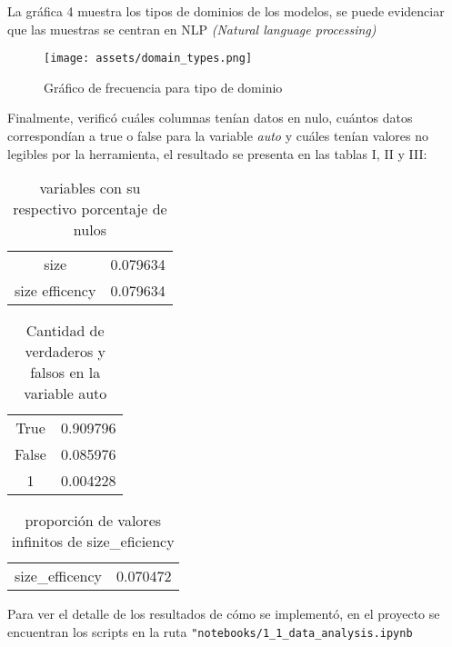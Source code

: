 \documentclass[journal]{IEEEtran}
\begin{document}
	La gráfica 4 muestra los tipos de dominios de los modelos, se puede evidenciar que las muestras se centran en NLP \textit{(Natural language processing)}
	\begin{figure}[H]
		\centering
		\texttt{[image: assets/domain\_types.png]}

		\caption{Gráfico de frecuencia para  tipo de dominio}
		\label{fig:pca_scatter}
	\end{figure}
	Finalmente, verificó cuáles columnas tenían datos en nulo, cuántos datos correspondían a true o false para la variable \textit{auto} y cuáles tenían valores no legibles por la herramienta, el resultado se presenta en las tablas I, II y III:


	\begin{table}[H]
		\centering
		\begin{tabular}{cc}
			size   & 0.079634 \\
			size efficency & 0.079634 \\
		\end{tabular}
		\caption{variables con su respectivo porcentaje de nulos}
		\label{tab:placeholder}
	\end{table}

	\begin{table}[H]
		\centering
		\begin{tabular}{cc}
			True   & 0.909796 \\
			False &  0.085976 \\
			1 & 0.004228 \\
		\end{tabular}
		\caption{Cantidad de verdaderos y falsos en la variable auto}
		\label{tab:placeholder}
	\end{table}

	\begin{table}[H]
		\centering
		\begin{tabular}{cc}
			size\_efficency   &  0.070472 \\
		\end{tabular}
		\caption{proporción de valores infinitos de size\_eficiency}
		\label{tab:placeholder}
	\end{table}
	Para ver el detalle de los resultados de cómo se implementó, en el proyecto se encuentran los scripts en la ruta \texttt{"notebooks/1\_1\_data\_analysis.ipynb}
\end{document}
